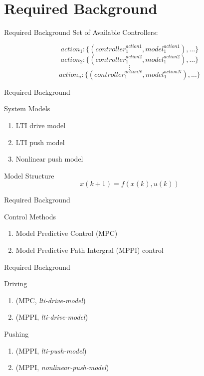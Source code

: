 \section{Required Background}
\begin{frame}[fragile]{Required Background} 
Set of Available Controllers:

\[action_1: \{ (\mathit{controller}_1^\mathit{action1}, \mathit{model}_1^\mathit{action1}), \dots \}\]
\[action_2: \{ (\mathit{controller}_1^\mathit{action2}, \mathit{model}_1^\mathit{action2}), \dots \}\]
\[\vdots\]
\[action_n:  \{ (\mathit{controller}_1^\mathit{actionN}, \mathit{model}_1^\mathit{actionN}), \dots \}\]
\end{frame}


\begin{frame}[fragile]{Required Background} 
\begin{block}{System Models}
\begin{enumerate}
  \item LTI drive model\pause
  \item LTI push model\pause
  \item Nonlinear push model
\end{enumerate}
\end{block}

\begin{example}{Model Structure}
  \[x(k+1) = f(x(k), u(k))\]
\end{example}
\end{frame}

\begin{frame}[fragile]{Required Background} 
\begin{block}{Control Methods}
\begin{enumerate}
  \item Model Predictive Control (MPC)
  \item Model Predictive Path Intergral (MPPI) control
\end{enumerate}
\end{block}
\end{frame}


\begin{frame}[fragile]{Required Background} 
\begin{block}{Driving}
\begin{enumerate}
  \item (MPC, \textit{lti-drive-model})
  \item (MPPI, \textit{lti-drive-model})
\end{enumerate}
\end{block}

\begin{block}{Pushing}
\begin{enumerate}
  \item (MPPI, \textit{lti-push-model})
  \item (MPPI, \textit{nonlinear-push-model})
\end{enumerate}
\end{block}
\end{frame}

